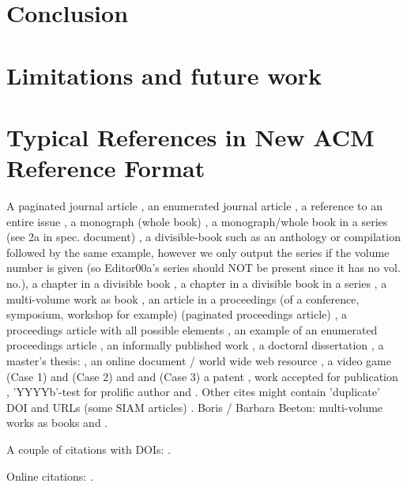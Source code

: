 

\section{Conclusion}



     







\section{Limitations and future work}





 




\section{Typical References in New ACM Reference Format}
A paginated journal article \cite{Abril07}, an enumerated
journal article \cite{Cohen07}, a reference to an entire issue \cite{JCohen96},
a monograph (whole book) \cite{Kosiur01}, a monograph/whole book in a series (see 2a in spec. document)
\cite{Harel79}, a divisible-book such as an anthology or compilation \cite{Editor00}
followed by the same example, however we only output the series if the volume number is given
\cite{Editor00a} (so Editor00a's series should NOT be present since it has no vol. no.),
a chapter in a divisible book \cite{Spector90}, a chapter in a divisible book
in a series \cite{Douglass98}, a multi-volume work as book \cite{Knuth97},
an article in a proceedings (of a conference, symposium, workshop for example)
(paginated proceedings article) \cite{Andler79}, a proceedings article
with all possible elements \cite{Smith10}, an example of an enumerated
proceedings article \cite{VanGundy07},
an informally published work \cite{Harel78}, a doctoral dissertation \cite{Clarkson85},
a master's thesis: \cite{anisi03}, an online document / world wide web
resource \cite{Thornburg01, Ablamowicz07, Poker06}, a video game (Case 1) \cite{Obama08} and (Case 2) \cite{Novak03}
and \cite{Lee05} and (Case 3) a patent \cite{JoeScientist001},
work accepted for publication \cite{rous08}, 'YYYYb'-test for prolific author
\cite{SaeediMEJ10} and \cite{SaeediJETC10}. Other cites might contain
'duplicate' DOI and URLs (some SIAM articles) \cite{Kirschmer:2010:AEI:1958016.1958018}.
Boris / Barbara Beeton: multi-volume works as books
\cite{MR781536} and \cite{MR781537}.

A couple of citations with DOIs: \cite{2004:ITE:1009386.1010128,
  Kirschmer:2010:AEI:1958016.1958018}. 

Online citations: \cite{TUGInstmem, Thornburg01, CTANacmart}.  




